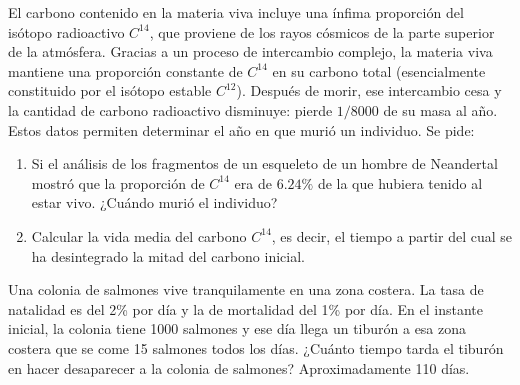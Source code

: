 {El carbono contenido en la materia viva incluye una ínfima proporción del isótopo radioactivo $C^{14}$, que proviene de los rayos cósmicos de la parte superior de la atmósfera.
Gracias a un proceso de intercambio complejo, la materia viva mantiene una proporción constante de $C^{14}$ en su carbono total (esencialmente constituido por el isótopo estable $C^{12}$).
Después de morir, ese intercambio cesa y la cantidad de carbono radioactivo disminuye: pierde $1/8000$ de su masa al año.
Estos datos permiten determinar el año en que murió un individuo. 
Se pide:
\begin{enumerate}
\item Si el análisis de los fragmentos de un esqueleto de un hombre de Neandertal mostró que la proporción de $C^{14}$ era de $6.24\%$ de la que hubiera tenido al estar vivo.
¿Cuándo murió el individuo?
\item Calcular la vida media del carbono $C^{14}$, es decir, el tiempo a partir del cual se ha desintegrado la mitad del carbono inicial.  
\end{enumerate}
}
{
}
{}


{Una colonia de salmones vive tranquilamente en una zona costera.
La tasa de natalidad es del 2\% por día y la de mortalidad del 1\% por día. 
En el instante inicial, la colonia tiene 1000 salmones y ese día llega un tiburón a esa zona costera que se come 15 salmones todos los días.
¿Cuánto tiempo tarda el tiburón en hacer desaparecer a la colonia de salmones?
}
{Aproximadamente 110 días.
}


